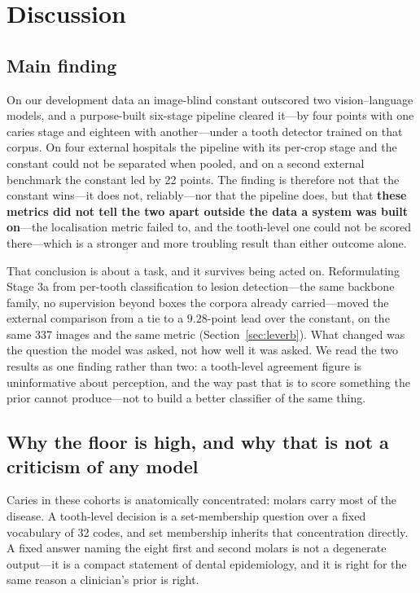 \documentclass[conference]{IEEEtran}
\begin{document}
\section{Discussion}

\subsection{Main finding}
On our development data an image-blind constant outscored two vision--language
models, and a purpose-built six-stage pipeline cleared it---by four points with
one caries stage and eighteen with another---under a tooth detector trained on
that corpus. On four external hospitals the pipeline with its per-crop stage and
the constant could not be separated when pooled, and on a second external benchmark
the constant led by 22 points. The finding is therefore not that the constant
wins---it does not, reliably---nor that the pipeline does, but that \textbf{these
metrics did not tell the two apart outside the data a system was built on}---the
localisation metric failed to, and the tooth-level one could not be scored there---which
is a stronger and more troubling result than either outcome alone.

That conclusion is about a task, and it survives being acted on. Reformulating
Stage 3a from per-tooth classification to lesion detection---the same backbone
family, no supervision beyond boxes the corpora already carried---moved the
external comparison from a tie to a $9.28$-point lead over the constant, on the
same 337 images and the same metric (Section~\ref{sec:leverb}). What changed was
the question the model was asked, not how well it was asked. We read the two
results as one finding rather than two: a tooth-level agreement figure is
uninformative about perception, and the way past that is to score something the
prior cannot produce---not to build a better classifier of the same thing.

\subsection{Why the floor is high, and why that is not a criticism of any model}
Caries in these cohorts is anatomically concentrated: molars carry most of the
disease. A tooth-level decision is a set-membership question over a fixed
vocabulary of 32 codes, and set membership inherits that concentration directly.
A fixed answer naming the eight first and second molars is not a degenerate
output---it is a compact statement of dental epidemiology, and it is right for
the same reason a clinician's prior is right.
\end{document}
